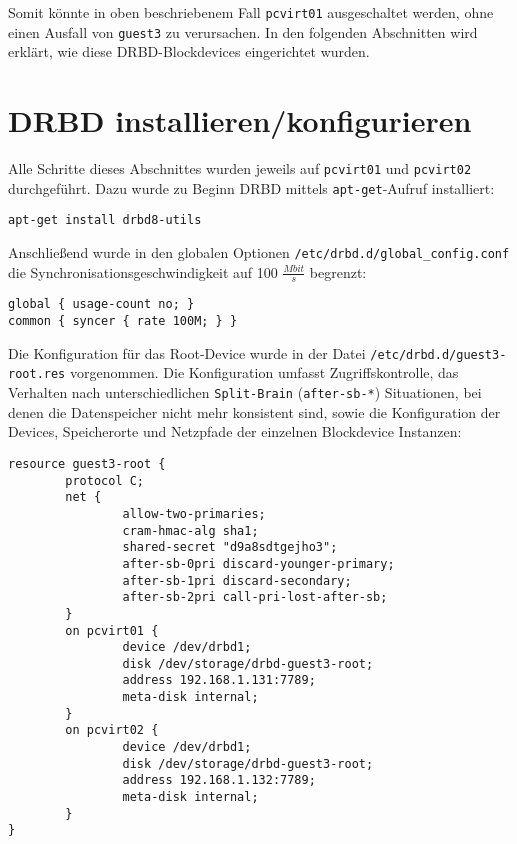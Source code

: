 Somit könnte in oben beschriebenem Fall \verb#pcvirt01# ausgeschaltet werden, ohne einen Ausfall von \verb#guest3# zu verursachen. In den folgenden Abschnitten wird erklärt, wie diese DRBD-Blockdevices eingerichtet wurden.

\section{DRBD installieren/konfigurieren}
Alle Schritte dieses Abschnittes wurden jeweils auf \verb#pcvirt01# und \verb#pcvirt02# durchgeführt. Dazu wurde zu Beginn DRBD mittels \verb#apt-get#-Aufruf installiert:
\setupVerbatimOut
\begin{verbatim}
apt-get install drbd8-utils
\end{verbatim}

Anschließend wurde in den globalen Optionen \verb|/etc/drbd.d/global_config.conf| die Syn\-chro\-ni\-sa\-ti\-ons\-ge\-schwind\-ig\-keit auf 100 $\frac{Mbit}{s}$ begrenzt:
\setupVerbatimOut
\begin{verbatim}
global { usage-count no; }
common { syncer { rate 100M; } }
\end{verbatim}

Die Konfiguration für das Root-Device wurde in der Datei \verb|/etc/drbd.d/guest3-root.res| vorgenommen. Die Konfiguration umfasst Zugriffskontrolle, das Verhalten nach unterschiedlichen \verb#Split-Brain# (\verb#after-sb-*#) Situationen, bei denen die Datenspeicher nicht mehr konsistent sind, sowie die Konfiguration der Devices, Speicherorte und Netzpfade der einzelnen Blockdevice Instanzen:
\setupVerbatimOut
\begin{verbatim}
resource guest3-root {
        protocol C;
        net {
                allow-two-primaries;
                cram-hmac-alg sha1;
                shared-secret "d9a8sdtgejho3";
                after-sb-0pri discard-younger-primary;
                after-sb-1pri discard-secondary;
                after-sb-2pri call-pri-lost-after-sb;
        }
        on pcvirt01 {
                device /dev/drbd1;
                disk /dev/storage/drbd-guest3-root;
                address 192.168.1.131:7789;
                meta-disk internal;
        }
        on pcvirt02 {
                device /dev/drbd1;
                disk /dev/storage/drbd-guest3-root;
                address 192.168.1.132:7789;
                meta-disk internal;
        }
}
\end{verbatim}

